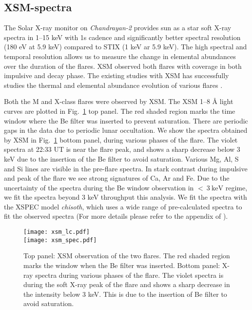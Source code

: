 \subsection{XSM-spectra}\label{sec:xsm}

The Solar X-ray monitor on {\it Chandrayan-2}\citep[{\it Chandrayan-2}/XSM,][]{xsm} provides sun as a star soft X-ray spectra in 1{--}15 keV with 1s cadence and significantly better spectral resolution (180 eV at 5.9 keV) compared to STIX (1 keV ar 5.9 keV). The high spectral and temporal resolution allows us to measure the change in elemental abundances over the duration of the flares. XSM observed both flares with coverage in both impulsive and decay phase. The existing studies with XSM has successfully studies the thermal and elemental abundance evolution of various flares \citep{mondal21,kkepa23,nama23}.

Both the M and X-class flares were observed by XSM. The XSM 1{--}8 {\AA} light curves are plotted in Fig.~\ref{fig:xsm-obs} top panel. The red shaded region marks the time window where the Be filter was inserted to prevent saturation. There are periodic gaps in the data due to periodic lunar occultation. We show the spectra obtained by XSM in Fig.~\ref{fig:xsm-obs} bottom panel, during various phases of the flare. The violet spectra at 22:33 UT is near the flare peak, and shows a sharp decrease below 3 keV due to the insertion of the Be filter to avoid saturation. Various Mg, Al, S and Si lines are visible in the pre-flare spectra. In stark contrast during impulsive and peak of the flare we see strong signatures of Ca, Ar and Fe. Due to the uncertainty of the spectra during the Be window observation in $<~3~\mathrm{keV}$ regime, we fit the spectra beyond 3 keV throughput this analysis. We fit the spectra with the XSPEC model {\it chisoth}, which uses a wide range of pre-calculated spectra to fit the observed spectra (For more details please refer to the appendix of \cite{mondal21}).

\begin{figure}[ht!]
\centering
    \texttt{[image: xsm\_lc.pdf]} \\
    \texttt{[image: xsm\_spec.pdf]}
    \caption{Top panel: XSM observation of the two flares. The red shaded region marks the window when the Be filter was inserted. Bottom panel: X-ray spectra during various phases of the flare. The violet spectra is during the soft X-ray peak of the flare and shows a sharp decrease in the intensity below 3 keV. This is due to the insertion of Be filter to avoid saturation.}
    \label{fig:xsm-obs}
\end{figure}

